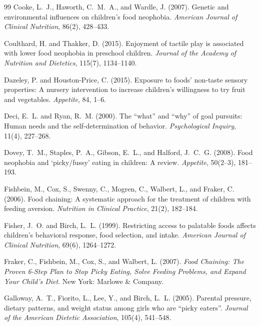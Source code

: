 \documentclass[11pt]{article}
\theoremstyle{remark}
\begin{document}
\begin{thebibliography}{99}
Cooke, L.~J., Haworth, C.~M.~A., and Wardle, J. (2007).
\newblock Genetic and environmental influences on children's food neophobia.
\newblock \emph{American Journal of Clinical Nutrition}, 86(2), 428--433.

Coulthard, H. and Thakker, D. (2015).
\newblock Enjoyment of tactile play is associated with lower food neophobia in preschool children.
\newblock \emph{Journal of the Academy of Nutrition and Dietetics}, 115(7), 1134--1140.

Dazeley, P. and Houston-Price, C. (2015).
\newblock Exposure to foods' non-taste sensory properties: A nursery intervention to increase children's willingness to try fruit and vegetables.
\newblock \emph{Appetite}, 84, 1--6.

Deci, E.~L. and Ryan, R.~M. (2000).
\newblock The ``what'' and ``why'' of goal pursuits: Human needs and the self-determination of behavior.
\newblock \emph{Psychological Inquiry}, 11(4), 227--268.

Dovey, T.~M., Staples, P.~A., Gibson, E.~L., and Halford, J.~C.~G. (2008).
\newblock Food neophobia and `picky/fussy' eating in children: A review.
\newblock \emph{Appetite}, 50(2--3), 181--193.

Fishbein, M., Cox, S., Swenny, C., Mogren, C., Walbert, L., and Fraker, C. (2006).
\newblock Food chaining: A systematic approach for the treatment of children with feeding aversion.
\newblock \emph{Nutrition in Clinical Practice}, 21(2), 182--184.

Fisher, J.~O. and Birch, L.~L. (1999).
\newblock Restricting access to palatable foods affects children's behavioral response, food selection, and intake.
\newblock \emph{American Journal of Clinical Nutrition}, 69(6), 1264--1272.

Fraker, C., Fishbein, M., Cox, S., and Walbert, L. (2007).
\newblock \emph{Food Chaining: The Proven 6-Step Plan to Stop Picky Eating, Solve Feeding Problems, and Expand Your Child's Diet}.
\newblock New York: Marlowe \& Company.

Galloway, A.~T., Fiorito, L., Lee, Y., and Birch, L.~L. (2005).
\newblock Parental pressure, dietary patterns, and weight status among girls who are ``picky eaters''.
\newblock \emph{Journal of the American Dietetic Association}, 105(4), 541--548.


\end{thebibliography}
\end{document}
